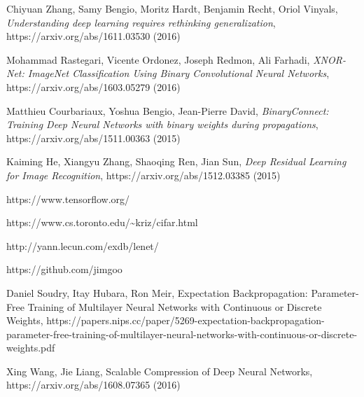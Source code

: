 \documentclass[licencjacka]{pracamgr}
\begin{document}
\begin{thebibliography}{99}

 Chiyuan Zhang, Samy Bengio, Moritz Hardt, Benjamin Recht, Oriol Vinyals, \textit{Understanding deep learning requires rethinking generalization}, https://arxiv.org/abs/1611.03530 (2016)

 Mohammad Rastegari, Vicente Ordonez, Joseph Redmon, Ali Farhadi, \textit{XNOR-Net: ImageNet Classification Using Binary Convolutional Neural Networks}, https://arxiv.org/abs/1603.05279 (2016)

 Matthieu Courbariaux, Yoshua Bengio, Jean-Pierre David, \textit{BinaryConnect: Training Deep Neural Networks with binary weights during propagations}, https://arxiv.org/abs/1511.00363 (2015)

 Kaiming He, Xiangyu Zhang, Shaoqing Ren, Jian Sun, \textit{Deep Residual Learning for Image Recognition}, https://arxiv.org/abs/1512.03385 (2015)

 https://www.tensorflow.org/

 https://www.cs.toronto.edu/\textasciitilde{}kriz/cifar.html

 http://yann.lecun.com/exdb/lenet/

 https://github.com/jimgoo

 Daniel Soudry, Itay Hubara, Ron Meir, Expectation Backpropagation: Parameter-Free
Training of Multilayer Neural Networks with
Continuous or Discrete Weights, https://papers.nips.cc/paper/5269-expectation-backpropagation-parameter-free-training-of-multilayer-neural-networks-with-continuous-or-discrete-weights.pdf

 Xing Wang, Jie Liang, Scalable Compression of Deep Neural Networks, https://arxiv.org/abs/1608.07365 (2016)

\end{thebibliography}
\end{document}

